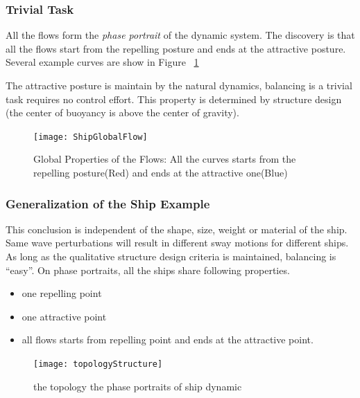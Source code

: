 \subsubsection*{Trivial Task}
All the flows form the \emph{phase portrait} of the dynamic system. 
The discovery is that all the flows start from the repelling posture and ends at the attractive posture.
Several example curves are show in Figure ~\ref{fig:globalflow}

The attractive posture is maintain by the natural dynamics, balancing  is a  trivial task requires no control effort.
This property is determined by structure design (the center of buoyancy is above the center of gravity).

\begin{figure}[!htbp]
  \begin{center}
   \texttt{[image: ShipGlobalFlow]}
   \caption{Global Properties of the Flows: All the curves starts from the repelling posture(Red) and ends at the attractive one(Blue)}
   \label{fig:globalflow}
  \end{center}
\end{figure}

 



\subsubsection*{Generalization of the Ship Example} 
This conclusion is independent of the shape, size, weight or material of the ship. 
Same wave perturbations will result in different sway motions for different ships.
As long as the qualitative structure design criteria is maintained, balancing is ``easy''.
On phase portraits,  all the ships share following properties. 
\begin{itemize}
\item one repelling point 
\item one attractive point 
\item all flows starts from repelling point and ends at the  attractive point. 
\end{itemize}


\begin{figure}[!htbp]
  \begin{center}
   \texttt{[image: topologyStructure]}
   \caption{the topology  the phase portraits of ship dynamic}
   \label{fig:topologyStructure}
  \end{center}
\end{figure}

